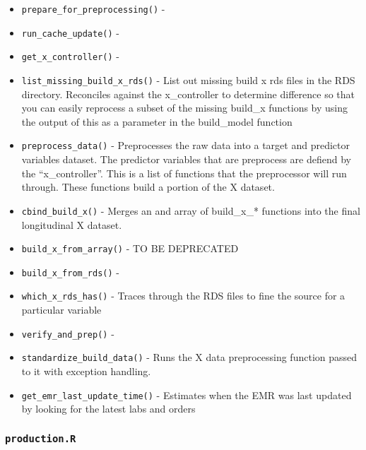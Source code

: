 \documentclass[
]{book}
\providecommand{\tightlist}{%
  \setlength{\itemsep}{0pt}\setlength{\parskip}{0pt}}
\begin{document}
\begin{itemize}
\tightlist
\item
  \texttt{prepare\_for\_preprocessing()} -
\item
  \texttt{run\_cache\_update()} -
\item
  \texttt{get\_x\_controller()} -
\item
  \texttt{list\_missing\_build\_x\_rds()} - List out missing build x rds files in the RDS directory. Reconciles against the x\_controller to determine difference so that you can easily reprocess a subset of the missing build\_x functions by using the output of this as a parameter in the build\_model function
\item
  \texttt{preprocess\_data()} - Preprocesses the raw data into a target and predictor variables dataset. The predictor variables that are preprocess are defiend by the ``x\_controller''. This is a list of functions that the preprocessor will run through. These functions build a portion of the X dataset.
\item
  \texttt{cbind\_build\_x()} - Merges an and array of build\_x\_* functions into the final longitudinal X dataset.
\item
  \texttt{build\_x\_from\_array()} - TO BE DEPRECATED
\item
  \texttt{build\_x\_from\_rds()} -
\item
  \texttt{which\_x\_rds\_has()} - Traces through the RDS files to fine the source for a particular variable
\item
  \texttt{verify\_and\_prep()} -
\item
  \texttt{standardize\_build\_data()} - Runs the X data preprocessing function passed to it with exception handling.
\item
  \texttt{get\_emr\_last\_update\_time()} - Estimates when the EMR was last updated by looking for the latest labs and orders
\end{itemize}

\hypertarget{production.r-1}{%
\subsubsection{\texorpdfstring{\texttt{production.R}}{production.R}}\label{production.r-1}}
\end{document}
